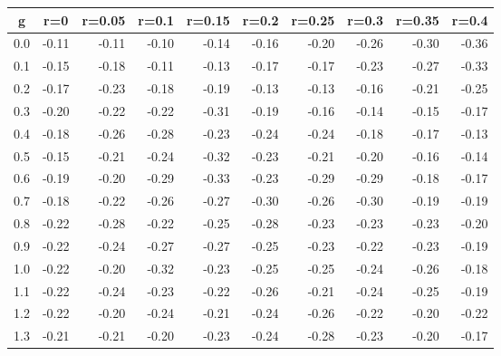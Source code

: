 %
\begin{table}[!tbp]
 \begin{center}
 \begin{tabular}{rrrrrrrrrr}\hline\hline
\multicolumn{1}{c}{g}&\multicolumn{1}{c}{r=0}&\multicolumn{1}{c}{r=0.05}&\multicolumn{1}{c}{r=0.1}&\multicolumn{1}{c}{r=0.15}&\multicolumn{1}{c}{r=0.2}&\multicolumn{1}{c}{r=0.25}&\multicolumn{1}{c}{r=0.3}&\multicolumn{1}{c}{r=0.35}&\multicolumn{1}{c}{r=0.4}\tabularnewline
\hline
0.0&-0.11&-0.11&-0.10&-0.14&-0.16&-0.20&-0.26&-0.30&-0.36\tabularnewline
0.1&-0.15&-0.18&-0.11&-0.13&-0.17&-0.17&-0.23&-0.27&-0.33\tabularnewline
0.2&-0.17&-0.23&-0.18&-0.19&-0.13&-0.13&-0.16&-0.21&-0.25\tabularnewline
0.3&-0.20&-0.22&-0.22&-0.31&-0.19&-0.16&-0.14&-0.15&-0.17\tabularnewline
0.4&-0.18&-0.26&-0.28&-0.23&-0.24&-0.24&-0.18&-0.17&-0.13\tabularnewline
0.5&-0.15&-0.21&-0.24&-0.32&-0.23&-0.21&-0.20&-0.16&-0.14\tabularnewline
0.6&-0.19&-0.20&-0.29&-0.33&-0.23&-0.29&-0.29&-0.18&-0.17\tabularnewline
0.7&-0.18&-0.22&-0.26&-0.27&-0.30&-0.26&-0.30&-0.19&-0.19\tabularnewline
0.8&-0.22&-0.28&-0.22&-0.25&-0.28&-0.23&-0.23&-0.23&-0.20\tabularnewline
0.9&-0.22&-0.24&-0.27&-0.27&-0.25&-0.23&-0.22&-0.23&-0.19\tabularnewline
1.0&-0.22&-0.20&-0.32&-0.23&-0.25&-0.25&-0.24&-0.26&-0.18\tabularnewline
1.1&-0.22&-0.24&-0.23&-0.22&-0.26&-0.21&-0.24&-0.25&-0.19\tabularnewline
1.2&-0.22&-0.20&-0.24&-0.21&-0.24&-0.26&-0.22&-0.20&-0.22\tabularnewline
1.3&-0.21&-0.21&-0.20&-0.23&-0.24&-0.28&-0.23&-0.20&-0.17\tabularnewline
\hline
\end{tabular}

\end{center}

\end{table}

